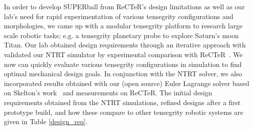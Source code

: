 In  order  to  develop  SUPERball  from  ReCTeR's  design
limitations as well as our lab's need for rapid experimentation
of  various  tensegrity  configurations  and  morphologies,  we
came  up  with  a  modular  tensegrity  platform  to  research
large  scale  robotic  tasks;  e.g.  a  tensegrity  planetary  probe
to explore Saturn's moon Titan.
Our lab obtained design requirements through an iterative approach with validated our NTRT simulator by experimental comparison with ReCTeR~\cite{Caluwaerts2013rsif}.
We now can quickly  evaluate  various
tensegrity  configurations  in  simulation  to  find  optimal  mechanical  design  goals.  In conjunction with the  NTRT  solver,  we  also
incorporated  results  obtained  with  our  (open  source)  Euler
Lagrange solver based on Skelton's work~\cite{Skelton2009} and measurements on ReCTeR.
The initial design requirements obtained from the NTRT simulations, refined designs after a first prototype build, and how these compare to other tensegrity robotic systems are given in Table \ref{design_req}.


